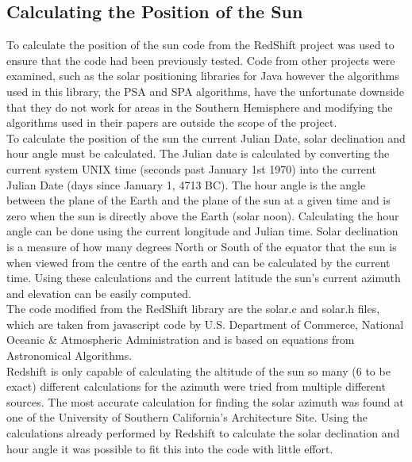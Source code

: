 \documentclass[12pt]{report}
\begin{document}
\subsection{Calculating the Position of the Sun}
To calculate the position of the sun code from the RedShift project\cite{redshift} was used to ensure that the code had been previously tested. Code from other projects were examined, such as the solar positioning libraries for Java\cite{javasunlib} however the algorithms used in this library, the PSA\cite{psa} and SPA\cite{spa} algorithms, have the unfortunate downside that they do not work for areas in the Southern Hemisphere and modifying the algorithms used in their papers are outside the scope of the project.\\

To calculate the position of the sun the current Julian Date, solar declination and hour angle must be calculated. The Julian date is calculated by converting the current system UNIX time (seconds past January 1st 1970) into the current Julian Date (days since January 1, 4713 BC).
The hour angle is the angle between the plane of the Earth and the plane of the sun at a given time and is zero when the sun is directly above the Earth (solar noon). Calculating the hour angle can be done using the current longitude and Julian time. Solar declination is a measure of how many degrees North or South of the equator that the sun is when viewed from the centre of the earth and can be calculated by the current time. Using these calculations and the current latitude the sun's current azimuth and elevation can be easily computed.\\

The code modified from the RedShift library are the solar.c and solar.h files, which are taken from javascript code by U.S. Department of Commerce, National Oceanic \& Atmospheric Administration\cite{usnoaa} and is based on equations from Astronomical Algorithms\cite{astronomicalalgorithms}. \\

Redshift is only capable of calculating the altitude of the sun so many (6 to be exact) different calculations for the azimuth were tried from multiple different sources. The most accurate calculation for finding the solar azimuth was found at one of the University of Southern California's Architecture Site\cite{solarazi}. Using the calculations already performed by Redshift to calculate the solar declination and hour angle it was possible to fit this into the code with little effort.\\
\end{document}
